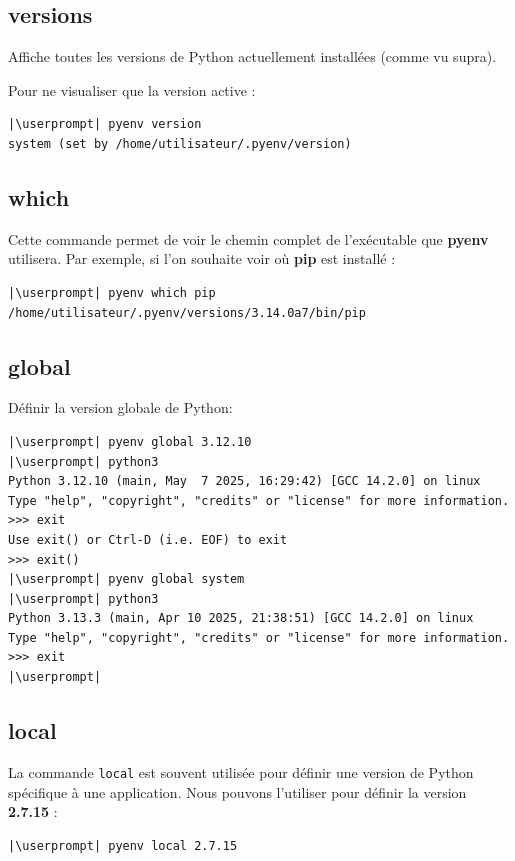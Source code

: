 \subsection*{versions}
Affiche toutes les versions de Python actuellement installées (comme vu supra).

Pour ne visualiser que la version active :
\begin{lstlisting}[style=bash]
|\userprompt| pyenv version
system (set by /home/utilisateur/.pyenv/version)
\end{lstlisting}

\subsection*{which}
Cette commande permet de voir le chemin complet de l'exécutable que \textbf{pyenv} utilisera. Par exemple, si l'on souhaite voir où \textbf{pip} est installé :
\begin{lstlisting}[style=bash]
|\userprompt| pyenv which pip
/home/utilisateur/.pyenv/versions/3.14.0a7/bin/pip
\end{lstlisting}

\subsection*{global}
Définir la version globale de Python:
\begin{lstlisting}[style=bash]
|\userprompt| pyenv global 3.12.10
|\userprompt| python3
Python 3.12.10 (main, May  7 2025, 16:29:42) [GCC 14.2.0] on linux
Type "help", "copyright", "credits" or "license" for more information.
>>> exit
Use exit() or Ctrl-D (i.e. EOF) to exit
>>> exit()
|\userprompt| pyenv global system
|\userprompt| python3
Python 3.13.3 (main, Apr 10 2025, 21:38:51) [GCC 14.2.0] on linux
Type "help", "copyright", "credits" or "license" for more information.
>>> exit
|\userprompt|
\end{lstlisting}

\subsection*{local}
La commande \texttt{local} est souvent utilisée pour définir une version de Python spécifique à une application. Nous pouvons l'utiliser pour définir la version \textbf{2.7.15} :
\begin{lstlisting}[style=bash]
|\userprompt| pyenv local 2.7.15
\end{lstlisting}

